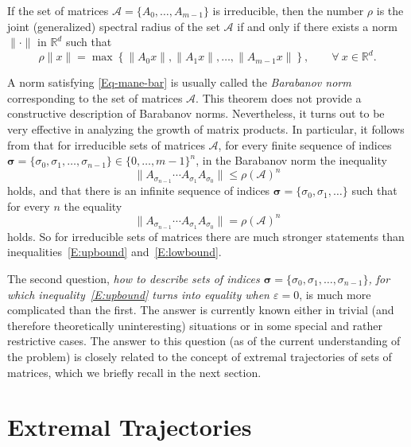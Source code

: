 \documentclass[a4paper,10pt,reqno]{amsart}
\newcommand{\setA}{\mathscr{A}}
\begin{document}
\begin{barthm}
\makeatletter{}\makeatother%
\label{T:Bar}%
If the set of matrices $\setA=\{A_{0},\ldots,A_{m-1}\}$ is irreducible, then
the number $\rho$ is the joint (generalized) spectral radius of the set
$\setA$ if and only if there exists a norm $\|\cdot\|$ in ${\mathbb{R}}^{d}$
such that
\begin{equation}\label{Eq-mane-bar}
\rho\|x\|= \max\left\{\|A_{0}x\|,\|A_{1}x\|,\ldots,\|A_{m-1}x\|\right\},
\qquad\forall~x\in\mathbb{R}^{d}.
\end{equation}
\end{barthm}
A norm satisfying \eqref{Eq-mane-bar} is usually called the \emph{Barabanov
norm} corresponding to the set of matrices $\setA$. This theorem does not
provide a constructive description of Barabanov norms. Nevertheless, it turns
out to be very effective in analyzing the growth of matrix products. In
particular, it follows from  that for irreducible sets of
matrices $\setA$, for every finite sequence of indices $\boldsymbol{\sigma}=
\{\sigma_{0},\sigma_{1},\ldots,\sigma_{n-1}\}\in{\{0,\ldots,m-1\}}^{n}$, in
the Barabanov norm the inequality
\[
\|A_{\sigma_{n-1}}\cdots A_{\sigma_{1}}A_{\sigma_{0}}\|\le
{\rho({\setA})}^{n}
\]
holds, and that there is an infinite sequence of indices
$\boldsymbol{\sigma}= \{\sigma_{0},\sigma_{1},\ldots\}$ such that for every
$n$ the equality
\[
\|A_{\sigma_{n-1}}\cdots A_{\sigma_{1}}A_{\sigma_{0}}\|= {\rho({\setA})}^{n}
\]
holds. So for irreducible sets of matrices there are much stronger statements
than inequalities~\eqref{E:upbound} and~\eqref{E:lowbound}.

The second question, \emph{how to describe sets of indices
$\boldsymbol{\sigma}= \{\sigma_{0},\sigma_{1},\ldots,\sigma_{n-1}\}$, for
which inequality~\eqref{E:upbound} turns into equality when $\varepsilon=0$},
is much more complicated than the first. The answer is currently known either
in trivial (and therefore theoretically uninteresting) situations or in some
special and rather restrictive cases. The answer to this question (as of the
current understanding of the problem) is closely related to the concept of
extremal trajectories of sets of matrices, which we briefly recall in the
next section.

\section{Extremal Trajectories}\label{S:barnorm}
\end{document}
